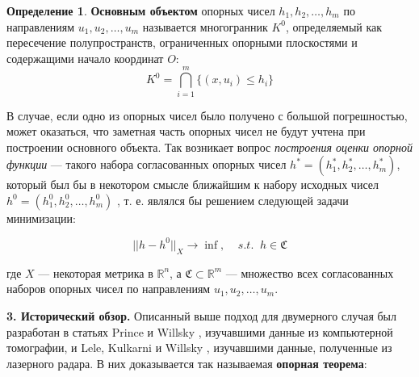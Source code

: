 \documentclass[a4paper, 10pt]{article}
\theoremstyle{definition}
\newtheorem{SmartDefinition}{Определение}
\theoremstyle{plain}
\theoremstyle{plain}
\begin{document}
\begin{SmartDefinition}
 \label{def:basic-object}
 \textbf{Основным объектом} опорных чисел $h_{1}, h_{2}, \ldots, h_{m}$ по
 направлениям $u_{1}, u_{2}, \ldots, u_{m}$ называется многогранник $K^{0}$,
 определяемый как пересечение полупространств, ограниченных опорными плоскостями
 и содержащими начало координат $O$:
 \begin{equation}
  K^{0} = \bigcap \limits_{i = 1}^{m}\{(x, u_{i}) \leq h_{i}\}
 \end{equation}
\end{SmartDefinition}

В случае, если одно из опорных чисел было получено с большой погрешностью, может
оказаться, что заметная часть опорных чисел не будут учтена при построении
основного объекта. Так возникает вопрос \textit{построения оценки опорной
функции} --- такого набора согласованных опорных чисел
$h^{*} = (h^{*}_{1}, h^{*}_{2}, \ldots, h^{*}_{m})$, который был бы в некотором
смысле ближайшим к набору исходных чисел
$h^{0} = (h^{0}_{1}, h^{0}_{2}, \ldots, h^{0}_{m})$
, т. е. являлся бы решением следующей задачи
минимизации:

\begin{equation}
 \label{equation:abstract-problem}
 ||h - h^{0} ||_{X} \to \inf, \;\;\;\; s. t. \;\; h \in \mathfrak{C}
\end{equation}

где $X$ --- некоторая метрика в $\mathbb{R}^{n}$, а
$\mathfrak{C} \subset \mathbb{R}^{m}$ --- множество всех согласованных наборов
опорных чисел по направлениям $u_{1}, u_{2}, \ldots, u_{m}$.

\textbf{3. Исторический обзор.} Описанный выше подход для двумерного случая был
разработан в статьях Prince и Willsky \cite{Prince:1990:RCS:81024.81035},
изучавшими данные из компьютерной томографии,  и Lele, Kulkarni и Willsky
\cite{Lele:92}, изучавшими данные, полученные из лазерного радара. В них
доказывается так называемая \textbf{опорная теорема}:
\end{document}
